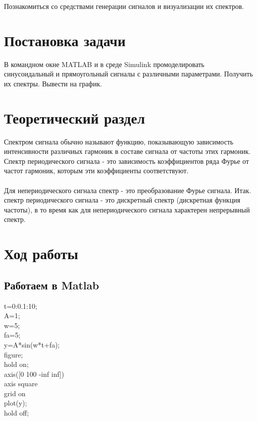 \documentclass[12pt,a4paper]{scrartcl}
\begin{document}
Познакомиться со средствами генерации сигналов и визуализации их спектров.\\

\section{Постановка задачи}
\label{sec:task}

В командном окне MATLAB и в среде Simulink промоделировать синусоидальный и прямоугольный сигналы с различными параметрами. Получить их спектры. Вывести на график.\\

\section{Теоретический раздел}
\label{sec:teoriya}
Спектром сигнала обычно называют функцию, показывающую
зависимость интенсивности различиых гармоник в составе сигнала от частоты этих гармоник. Спектр периодического сигнала - это зависимость коэффициентов ряда Фурье от частот гармоник, которым эти коэффициенты соответствуют.\\
\\
Для непериодического сигнала спектр - это преобразование
Фурье сигнала. Итак. спектр периодического сигнала - это дискретный спектр (дискретная функция частоты), в то время как для непериодического сигнала характерен непрерывный спектр.

\section{Ход работы}
\label{sec:work}

\subsection{Работаем в Matlab}
\label{sec:workMatlab}

t=0:0.1:10;\\
A=1;\\
w=5;\\
fa=5;\\

y=A*sin(w*t+fa);\\

figure;\\
hold on;\\
axis([0 100 -inf inf])\\
axis square\\
grid on\\
plot(y);\\
hold off;\\
\end{document}
